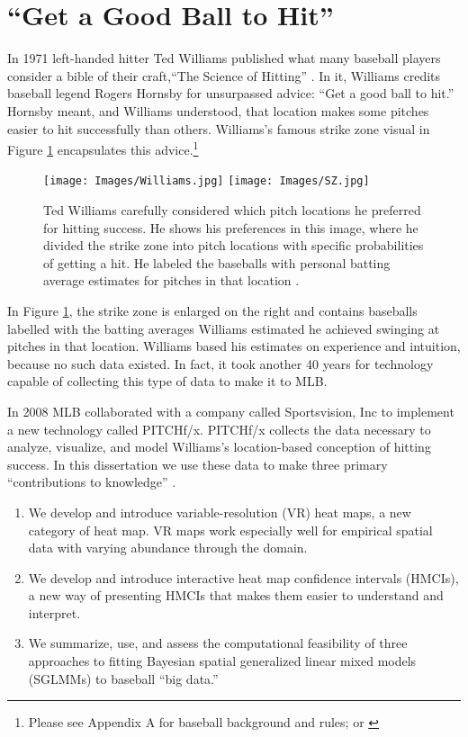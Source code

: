 \section{``Get a Good Ball to Hit''}
In 1971 left-handed hitter Ted Williams published what many baseball players consider a bible of their craft,``The Science of Hitting'' \citep{Williams1971}. In it, Williams credits baseball legend Rogers Hornsby for unsurpassed advice: ``Get a good ball to hit.'' Hornsby meant, and Williams understood, that location makes some pitches easier to hit successfully than others. Williams's famous strike zone visual in Figure \ref{fig:Williams} encapsulates this advice.\footnote{Please see Appendix A for baseball background and rules; or \citep{Wiki}}
        \begin{figure}[H]
      	\centering
      	\texttt{[image: Images/Williams.jpg]} 
      	\texttt{[image: Images/SZ.jpg]}
      	\caption{Ted Williams carefully considered which pitch locations he preferred for hitting success. He shows his preferences in this image, where he divided the strike zone into pitch locations with specific probabilities of getting a hit. He labeled the baseballs with personal batting average estimates for pitches in that location \citep{Williams1971}.}
      	\label{fig:Williams}
      	\end{figure} 
In Figure \ref{fig:Williams}, the strike zone is enlarged on the right and contains baseballs labelled with the batting averages Williams estimated he achieved swinging at pitches in that location. Williams based his estimates on experience and intuition, because no such data existed. In fact, it took another 40 years for technology capable of collecting this type of data to make it to MLB\textsuperscript{\textregistered}.

In 2008 MLB collaborated with a company called Sportsvision, Inc to implement a new technology called PITCHf/x\textsuperscript{\textregistered}. PITCHf/x\textsuperscript{\textregistered} collects the data necessary to analyze, visualize, and model Williams's location-based conception of hitting success. In this dissertation we use these data to make three primary ``contributions to knowledge'' \cite{gradguide}.
\begin{enumerate}
\item We develop and introduce variable-resolution (VR) heat maps, a new category of heat map. VR maps work especially well for empirical spatial data with varying abundance through the domain. 
\item We develop and introduce interactive heat map confidence intervals (HMCIs), a new way of presenting HMCIs that makes them easier to understand and interpret.
\item We summarize, use, and assess the computational feasibility of three approaches to fitting Bayesian spatial generalized linear mixed models (SGLMMs) to baseball ``big data.''
\end{enumerate}

